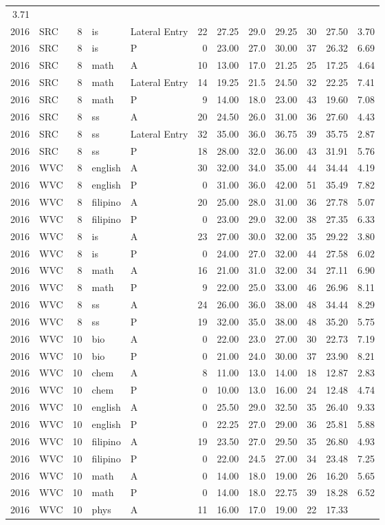\documentclass[]{article}
\begin{document}
\begin{longtable}[]{@{}rlrllrrrrrrr@{}}
3.71\tabularnewline
2016 & SRC & 8 & is & Lateral Entry & 22 & 27.25 & 29.0 & 29.25 & 30 &
27.50 & 3.70\tabularnewline
2016 & SRC & 8 & is & P & 0 & 23.00 & 27.0 & 30.00 & 37 & 26.32 &
6.69\tabularnewline
2016 & SRC & 8 & math & A & 10 & 13.00 & 17.0 & 21.25 & 25 & 17.25 &
4.64\tabularnewline
2016 & SRC & 8 & math & Lateral Entry & 14 & 19.25 & 21.5 & 24.50 & 32 &
22.25 & 7.41\tabularnewline
2016 & SRC & 8 & math & P & 9 & 14.00 & 18.0 & 23.00 & 43 & 19.60 &
7.08\tabularnewline
2016 & SRC & 8 & ss & A & 20 & 24.50 & 26.0 & 31.00 & 36 & 27.60 &
4.43\tabularnewline
2016 & SRC & 8 & ss & Lateral Entry & 32 & 35.00 & 36.0 & 36.75 & 39 &
35.75 & 2.87\tabularnewline
2016 & SRC & 8 & ss & P & 18 & 28.00 & 32.0 & 36.00 & 43 & 31.91 &
5.76\tabularnewline
2016 & WVC & 8 & english & A & 30 & 32.00 & 34.0 & 35.00 & 44 & 34.44 &
4.19\tabularnewline
2016 & WVC & 8 & english & P & 0 & 31.00 & 36.0 & 42.00 & 51 & 35.49 &
7.82\tabularnewline
2016 & WVC & 8 & filipino & A & 20 & 25.00 & 28.0 & 31.00 & 36 & 27.78 &
5.07\tabularnewline
2016 & WVC & 8 & filipino & P & 0 & 23.00 & 29.0 & 32.00 & 38 & 27.35 &
6.33\tabularnewline
2016 & WVC & 8 & is & A & 23 & 27.00 & 30.0 & 32.00 & 35 & 29.22 &
3.80\tabularnewline
2016 & WVC & 8 & is & P & 0 & 24.00 & 27.0 & 32.00 & 44 & 27.58 &
6.02\tabularnewline
2016 & WVC & 8 & math & A & 16 & 21.00 & 31.0 & 32.00 & 34 & 27.11 &
6.90\tabularnewline
2016 & WVC & 8 & math & P & 9 & 22.00 & 25.0 & 33.00 & 46 & 26.96 &
8.11\tabularnewline
2016 & WVC & 8 & ss & A & 24 & 26.00 & 36.0 & 38.00 & 48 & 34.44 &
8.29\tabularnewline
2016 & WVC & 8 & ss & P & 19 & 32.00 & 35.0 & 38.00 & 48 & 35.20 &
5.75\tabularnewline
2016 & WVC & 10 & bio & A & 0 & 22.00 & 23.0 & 27.00 & 30 & 22.73 &
7.19\tabularnewline
2016 & WVC & 10 & bio & P & 0 & 21.00 & 24.0 & 30.00 & 37 & 23.90 &
8.21\tabularnewline
2016 & WVC & 10 & chem & A & 8 & 11.00 & 13.0 & 14.00 & 18 & 12.87 &
2.83\tabularnewline
2016 & WVC & 10 & chem & P & 0 & 10.00 & 13.0 & 16.00 & 24 & 12.48 &
4.74\tabularnewline
2016 & WVC & 10 & english & A & 0 & 25.50 & 29.0 & 32.50 & 35 & 26.40 &
9.33\tabularnewline
2016 & WVC & 10 & english & P & 0 & 22.25 & 27.0 & 29.00 & 36 & 25.81 &
5.88\tabularnewline
2016 & WVC & 10 & filipino & A & 19 & 23.50 & 27.0 & 29.50 & 35 & 26.80
& 4.93\tabularnewline
2016 & WVC & 10 & filipino & P & 0 & 22.00 & 24.5 & 27.00 & 34 & 23.48 &
7.25\tabularnewline
2016 & WVC & 10 & math & A & 0 & 14.00 & 18.0 & 19.00 & 26 & 16.20 &
5.65\tabularnewline
2016 & WVC & 10 & math & P & 0 & 14.00 & 18.0 & 22.75 & 39 & 18.28 &
6.52\tabularnewline
2016 & WVC & 10 & phys & A & 11 & 16.00 & 17.0 & 19.00 & 22 & 17.33 &

\end{longtable}
\end{document}
